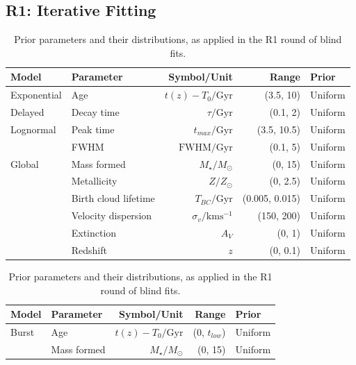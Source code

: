 \documentclass[a4paper,12pt]{article}
\begin{document}
\subsection{R1: Iterative Fitting}\label{sec:r1}

\begin{table}[h]
  \centering
  \begin{tabular}{l l r r l}
    Model       & Parameter            & Symbol/Unit                  & Range          & Prior   \\
    \hline \hline
    Exponential & Age                  & $t(z)-T_0/\mathrm{Gyr}$      & (3.5, 10)      & Uniform \\
    Delayed     & Decay time           & $\tau/\mathrm{Gyr}$          & (0.1, 2)       & Uniform \\
    \hline
    Lognormal   & Peak time            & $t_{max}/\mathrm{Gyr}$       & (3.5, 10.5)    & Uniform \\
                & FWHM                 & $\mathrm{FWHM/Gyr}$          & (0.1, 5)       & Uniform \\
    \hline
    Global      & Mass formed          & $M_\star/M_\odot$            & (0, 15)        & Uniform \\
                & Metallicity          & $Z/Z_\odot$                  & (0, 2.5)       & Uniform \\
                & Birth cloud lifetime & $T_{BC}/\mathrm{Gyr}$        & (0.005, 0.015) & Uniform \\
                & Velocity dispersion  & $\sigma_v/\mathrm{kms^{-1}}$ & (150, 200)     & Uniform \\
                & Extinction           & $A_V$                        & (0, 1)         & Uniform \\
                & Redshift             & $z$                          & (0, 0.1)       & Uniform \\
    \hline
  \end{tabular}
  \caption{Prior parameters and their distributions, as applied in the R1 round of blind fits.}
  \label{tab:r1_priors}
\end{table}

\begin{table}[h]
  \centering
  \begin{tabular}{l l r r l}
    Model & Parameter   & Symbol/Unit             & Range           & Prior   \\
    \hline \hline
    Burst & Age         & $t(z)-T_0/\mathrm{Gyr}$ & (0, $t_{low}$)  & Uniform \\
          & Mass formed & $M_\star/M_\odot$       & (0, 15)         & Uniform \\
    \hline
  \end{tabular}
  \caption{Prior parameters and their distributions, as applied in the R1 round of blind fits.}
  \label{tab:r1_burst_priors}
\end{table}
\end{document}

